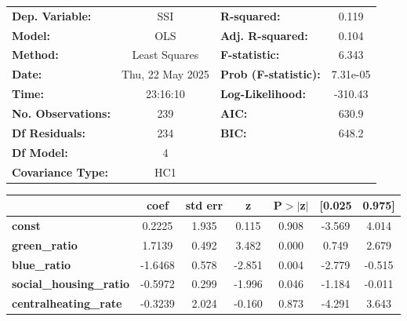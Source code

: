 \begin{center}
\begin{tabular}{lclc}
\toprule
\textbf{Dep. Variable:}         &       SSI        & \textbf{  R-squared:         } &     0.119   \\
\textbf{Model:}                 &       OLS        & \textbf{  Adj. R-squared:    } &     0.104   \\
\textbf{Method:}                &  Least Squares   & \textbf{  F-statistic:       } &     6.343   \\
\textbf{Date:}                  & Thu, 22 May 2025 & \textbf{  Prob (F-statistic):} &  7.31e-05   \\
\textbf{Time:}                  &     23:16:10     & \textbf{  Log-Likelihood:    } &   -310.43   \\
\textbf{No. Observations:}      &         239      & \textbf{  AIC:               } &     630.9   \\
\textbf{Df Residuals:}          &         234      & \textbf{  BIC:               } &     648.2   \\
\textbf{Df Model:}              &           4      & \textbf{                     } &             \\
\textbf{Covariance Type:}       &       HC1        & \textbf{                     } &             \\
\bottomrule
\end{tabular}
\begin{tabular}{lcccccc}
                                & \textbf{coef} & \textbf{std err} & \textbf{z} & \textbf{P$> |$z$|$} & \textbf{[0.025} & \textbf{0.975]}  \\
\midrule
\textbf{const}                  &       0.2225  &        1.935     &     0.115  &         0.908        &       -3.569    &        4.014     \\
\textbf{green\_ratio}           &       1.7139  &        0.492     &     3.482  &         0.000        &        0.749    &        2.679     \\
\textbf{blue\_ratio}            &      -1.6468  &        0.578     &    -2.851  &         0.004        &       -2.779    &       -0.515     \\
\textbf{social\_housing\_ratio} &      -0.5972  &        0.299     &    -1.996  &         0.046        &       -1.184    &       -0.011     \\
\textbf{centralheating\_rate}   &      -0.3239  &        2.024     &    -0.160  &         0.873        &       -4.291    &        3.643     \\

\end{tabular}
\end{center}
